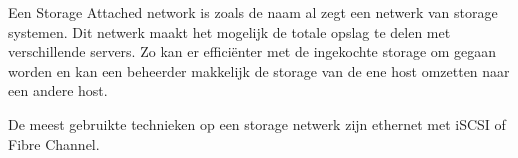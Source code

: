 Een Storage Attached network is zoals de naam al zegt een netwerk van storage systemen. Dit netwerk maakt het mogelijk de totale opslag te delen met verschillende servers. Zo kan er effici\"enter met de ingekochte storage om gegaan worden en kan een beheerder makkelijk de storage van de ene host omzetten naar een andere host.

De meest gebruikte technieken op een storage netwerk zijn ethernet met iSCSI of Fibre Channel.
